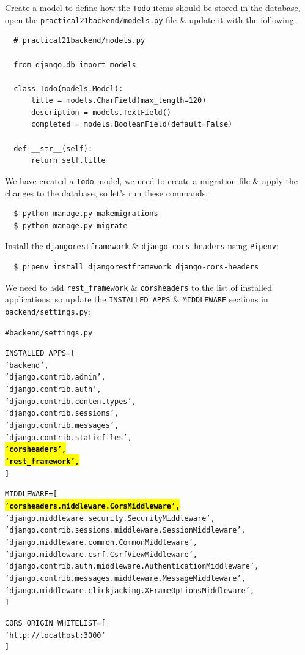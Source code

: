 \documentclass{article}
\begin{document}
Create a model to define how the \texttt{Todo} items should be stored in the database, open the \texttt{practical21backend/models.py} file \& update it with the following:

\begin{verbatim}
  # practical21backend/models.py

  from django.db import models

  class Todo(models.Model):
      title = models.CharField(max_length=120)
      description = models.TextField()
      completed = models.BooleanField(default=False)

  def __str__(self):
      return self.title
\end{verbatim}

We have created a \texttt{Todo} model, we need to create a migration file \& apply the changes to the database, so let’s run these commands:

\begin{verbatim}
  $ python manage.py makemigrations
  $ python manage.py migrate 
\end{verbatim}

Install the \texttt{djangorestframework} \& \texttt{django-cors-headers} using \texttt{Pipenv}:

\begin{verbatim}
  $ pipenv install djangorestframework django-cors-headers
\end{verbatim}

We need to add \texttt{rest\_framework} \& \texttt{corsheaders} to the list of installed applications, so update the \texttt{INSTALLED\_APPS} \& \texttt{MIDDLEWARE} sections in \texttt{backend/settings.py}:

\begin{alltt}
  # backend/settings.py

  INSTALLED_APPS = [
      'backend',
      'django.contrib.admin',
      'django.contrib.auth',
      'django.contrib.contenttypes',
      'django.contrib.sessions',
      'django.contrib.messages',
      'django.contrib.staticfiles',
      \hl{\textbf{'corsheaders',}}                          
      \hl{\textbf{'rest_framework',}}          
  ]

  MIDDLEWARE = [
      \hl{\textbf{'corsheaders.middleware.CorsMiddleware',}} 
      'django.middleware.security.SecurityMiddleware',
      'django.contrib.sessions.middleware.SessionMiddleware',
      'django.middleware.common.CommonMiddleware',
      'django.middleware.csrf.CsrfViewMiddleware',
      'django.contrib.auth.middleware.AuthenticationMiddleware',
      'django.contrib.messages.middleware.MessageMiddleware',
      'django.middleware.clickjacking.XFrameOptionsMiddleware',
  ]

  CORS_ORIGIN_WHITELIST = [
    'http://localhost:3000'
  ]

\end{alltt}
\end{document}
